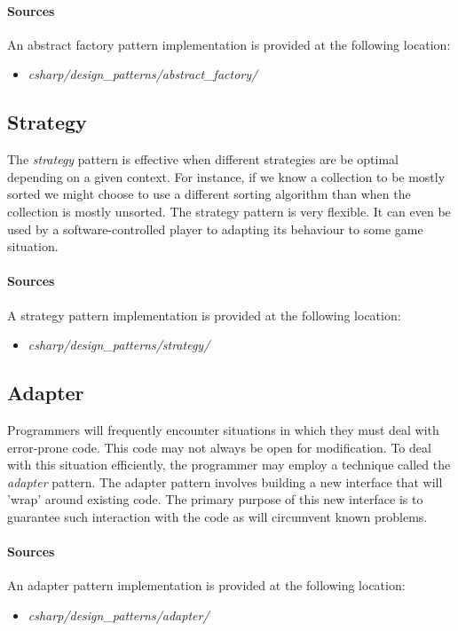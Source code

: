 \documentclass{article}
\begin{document}
\begin{samepage}
  \paragraph{Sources}
  An abstract factory pattern implementation is provided at the following location:
  \begin{itemize}
  \item{{\em csharp/design\_patterns/abstract\_factory/}}
  \end{itemize}
\end{samepage}


\subsection{Strategy}
The {\em strategy} pattern is effective when different strategies are be optimal depending on a given context. For instance,
if we know a collection to be mostly sorted we might choose to use a different sorting algorithm than when the collection is
mostly unsorted. The strategy pattern is very flexible. It can even be used by a software-controlled player to adapting its
behaviour to some game situation.

\begin{samepage}
  \paragraph{Sources}
  A strategy pattern implementation is provided at the following location:
  \begin{itemize}
  \item{{\em csharp/design\_patterns/strategy/}}
  \end{itemize}
\end{samepage}


\subsection{Adapter}
Programmers will frequently encounter situations in which they must deal with error-prone code. This code may not always be
open for modification. To deal with this situation efficiently, the programmer may employ a technique called the
{\em adapter} pattern. The adapter pattern involves building a new interface that will 'wrap' around existing code.
The primary purpose of this new interface is to guarantee such interaction with the code as will circumvent known problems.

\begin{samepage}
  \paragraph{Sources}
  An adapter pattern implementation is provided at the following location:
  \begin{itemize}
  \item{{\em csharp/design\_patterns/adapter/}}
  \end{itemize}
\end{samepage}
\end{document}
